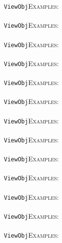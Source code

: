 \documentclass[a4paper,11pt]{report}
\begin{document}
{{ \texttt{ViewObj}{\nobreakspace}{\nobreakspace}{\nobreakspace}{\nobreakspace}\textsc{Examples:} \\
 \\
 \texttt{ViewObj}{\nobreakspace}{\nobreakspace}{\nobreakspace}{\nobreakspace}\textsc{Examples:} \\
 \\
 \texttt{ViewObj}{\nobreakspace}{\nobreakspace}{\nobreakspace}{\nobreakspace}\textsc{Examples:} \\
 \\
 \texttt{ViewObj}{\nobreakspace}{\nobreakspace}{\nobreakspace}{\nobreakspace}\textsc{Examples:} \\
 \\
 \texttt{ViewObj}{\nobreakspace}{\nobreakspace}{\nobreakspace}{\nobreakspace}\textsc{Examples:} \\
 \\
 \texttt{ViewObj}{\nobreakspace}{\nobreakspace}{\nobreakspace}{\nobreakspace}\textsc{Examples:} \\
 \\
 \texttt{ViewObj}{\nobreakspace}{\nobreakspace}{\nobreakspace}{\nobreakspace}\textsc{Examples:} \\
 \\
 \texttt{ViewObj}{\nobreakspace}{\nobreakspace}{\nobreakspace}{\nobreakspace}\textsc{Examples:} \\
 \\
 \texttt{ViewObj}{\nobreakspace}{\nobreakspace}{\nobreakspace}{\nobreakspace}\textsc{Examples:} \\
 \\
 \texttt{ViewObj}{\nobreakspace}{\nobreakspace}{\nobreakspace}{\nobreakspace}\textsc{Examples:} \\
 \\
 \texttt{ViewObj}{\nobreakspace}{\nobreakspace}{\nobreakspace}{\nobreakspace}\textsc{Examples:} \\
 \\
 \texttt{ViewObj}{\nobreakspace}{\nobreakspace}{\nobreakspace}{\nobreakspace}\textsc{Examples:} \\
 \\
 \texttt{ViewObj}{\nobreakspace}{\nobreakspace}{\nobreakspace}{\nobreakspace}\textsc{Examples:} \\
 \\
}}
\end{document}

